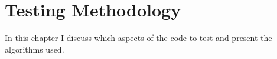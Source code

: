 \chapter{Testing Methodology}

In this chapter I discuss which aspects of the code to test and present the algorithms used.



